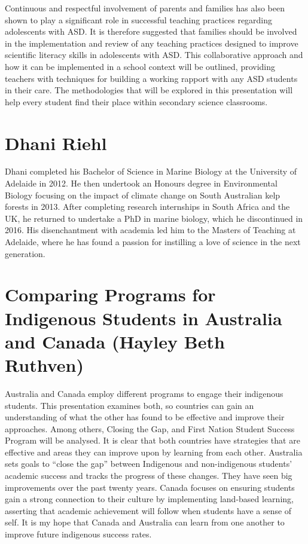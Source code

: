 \documentclass[twoside,12pt,a4paper,notitlepage]{memoir}
\begin{document}
Continuous and respectful involvement of parents and families has also been shown to play a significant role in successful teaching practices regarding adolescents with ASD. It is therefore suggested that families should be involved in the implementation and review of any teaching practices designed to improve scientific literacy skills in adolescents with ASD. This collaborative approach and how it can be implemented in a school context will be outlined, providing teachers with techniques for building a working rapport with any ASD students in their care. The methodologies that will be explored in this presentation will help every student find their place within secondary science classrooms.

\section*{Dhani Riehl}

Dhani completed his Bachelor of Science in Marine Biology at the University of Adelaide in 2012. He then undertook an Honours degree in Environmental Biology focusing on the impact of climate change on South Australian kelp forests in 2013. After completing research internships in South Africa and the UK, he returned to undertake a PhD in marine biology, which he discontinued in 2016. His disenchantment with academia led him to the Masters of Teaching at Adelaide, where he has found a passion for instilling a love of science in the next generation.



\pagebreak
\section*{Comparing Programs for Indigenous Students in Australia and Canada (Hayley Beth Ruthven)}
\label{aut:ruthven}

Australia and Canada employ different programs to engage their indigenous students. This presentation examines both, so countries can gain an understanding of what the other has found to be effective and improve their approaches. 
Among others, Closing the Gap, and First Nation Student Success Program will be analysed. It is clear that both countries have strategies that are effective and areas they can improve upon by learning from each other. Australia sets goals to “close the gap” between Indigenous and non-indigenous students’ academic success and tracks the progress of these changes. They have seen big improvements over the past twenty years. Canada focuses on ensuring students gain a strong connection to their culture by implementing land-based learning, asserting that academic achievement will follow when students have a sense of self. 
It is my hope that Canada and Australia can learn from one another to improve future indigenous success rates. 
\end{document}
